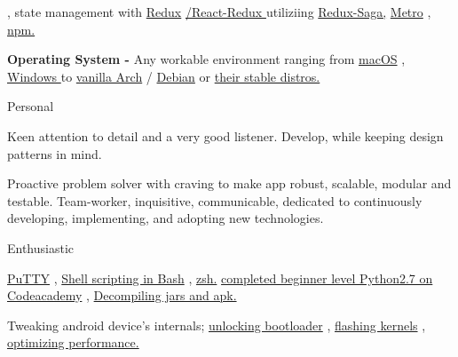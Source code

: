 \begin{skillsentries}
{\begin{skillsitems}
{        , state management with 
        {\href{https://redux.js.org}{Redux}}
        {\href{https://react-redux.js.org}{/React-Redux }}
        utiliziing 
        {\href{https://redux-saga.js.org}{Redux-Saga,}} 
        {\href{https://github.com/facebook/metro}{Metro}}
        ,
         {\href{https://www.npmjs.com}{npm.}}}
        \item {\textbf{Operating System - } Any workable environment ranging from 
        {\href{https://www.apple.com/lae/macos/mojave/}{macOS}}
        , 
        {\href{https://www.microsoft.com/en-us/windows}{Windows }}
        to  
        {\href{https://www.archlinux.org}{vanilla Arch}}
        /
        {\href{https://www.debian.org}{Debian}} 
        or 
        {\href{https://distrowatch.com}{their stable distros.}}}
      \end{skillsitems}
    }

    
    \skillsentry
    {Personal} %
    {
      \begin{skillsitems} %
        \item {Keen attention to detail and a very good listener. Develop, while keeping design patterns in mind.}
        \item {Proactive problem solver with craving to make app robust, scalable, modular and testable. Team-worker, inquisitive, communicable, 
        dedicated to continuously developing, implementing, and adopting new technologies.}
      \end{skillsitems}
      }
      
      \skillsentry
      {Enthusiastic} %
      {
        \begin{skillsitems} %
          \item {{\href{https://www.putty.org}{PuTTY}}
          , 
          {\href{https://en.wikibooks.org/wiki/Bash_Shell_Scripting}{Shell scripting in Bash}}
          ,  
          {\href{http://zsh.sourceforge.net}{zsh.}} 
          {\href{https://www.codecademy.com/learn}{completed beginner level Python2.7 on Codeacademy}}
          , 
          {\href{https://www.xda-developers.com/decompile-and-modify-apks-on-the-go-with-apktool-for-android/}{Decompiling jars and apk.}}}
          \item {Tweaking android device's internals; 
          {\href{https://forum.xda-developers.com/wiki/Bootloader}{unlocking bootloader}}
          , 
          {\href{https://forum.xda-developers.com/google-nexus-5/development\#kernels}{flashing kernels}}
          , 
          {\href{https://forum.xda-developers.com/google-nexus-5/general/android-toolkit-t2690032}{optimizing performance.}}}
        \end{skillsitems}
      }
\end{skillsentries}
